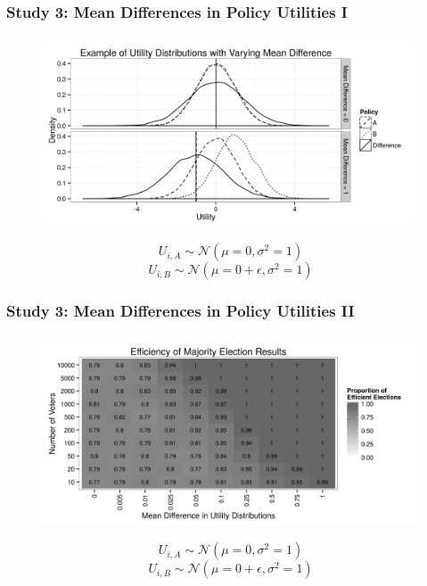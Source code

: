 \documentclass{beamer}
\begin{document}
\subsection{}
\begin{frame}%
  \frametitle{Study 3: Mean Differences in Policy Utilities I}
  \begin{figure}[ht]\centering
    \includegraphics[height=.7\textheight]{../simulations/fig/s3a.png}
  \end{figure}
	$$ U_{i,A} \sim \mathcal{N}(\mu=0,\sigma^2=1) $$
        $$ U_{i,B} \sim \mathcal{N}(\mu=0+\epsilon,\sigma^2=1) $$
\end{frame}
\begin{frame}%
  \frametitle{Study 3: Mean Differences in Policy Utilities II}
  \begin{figure}[ht]\centering
    \includegraphics[height=.7\textheight]{../simulations/fig/s3b.png}
  \end{figure}
	$$ U_{i,A} \sim \mathcal{N}(\mu=0,\sigma^2=1) $$
        $$ U_{i,B} \sim \mathcal{N}(\mu=0+\epsilon,\sigma^2=1) $$
\end{frame}
\end{document}
